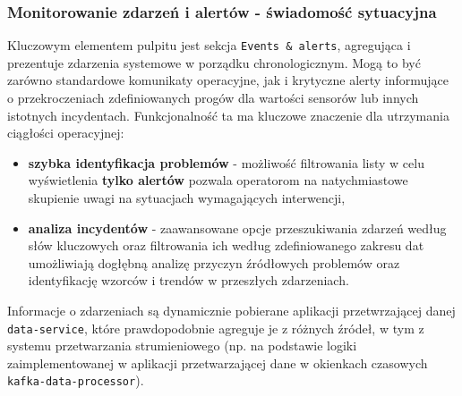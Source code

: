 \subsubsection{Monitorowanie zdarzeń i alertów - świadomość sytuacyjna}
Kluczowym elementem pulpitu jest sekcja \texttt{Events \& alerts}, agregująca i prezentuje zdarzenia systemowe w porządku chronologicznym. Mogą to być zarówno standardowe komunikaty operacyjne, jak i krytyczne alerty informujące o przekroczeniach zdefiniowanych progów dla wartości sensorów lub innych istotnych incydentach. Funkcjonalność ta ma kluczowe znaczenie dla utrzymania ciągłości operacyjnej:
\begin{itemize}
    \item \textbf{szybka identyfikacja problemów} - możliwość filtrowania listy w celu wyświetlenia \textbf{tylko alertów} pozwala operatorom na natychmiastowe skupienie uwagi na sytuacjach wymagających interwencji,
    \item \textbf{analiza incydentów} - zaawansowane opcje przeszukiwania zdarzeń według słów kluczowych oraz filtrowania ich według zdefiniowanego zakresu dat umożliwiają dogłębną analizę przyczyn źródłowych problemów oraz identyfikację wzorców i trendów w przeszłych zdarzeniach.
\end{itemize}
Informacje o zdarzeniach są dynamicznie pobierane aplikacji przetwrzającej danej \texttt{data-service}, które prawdopodobnie agreguje je z różnych źródeł, w tym z systemu przetwarzania strumieniowego (np. na podstawie logiki zaimplementowanej w aplikacji przetwarzającej dane w okienkach czasowych \texttt{kafka-data-processor}).

